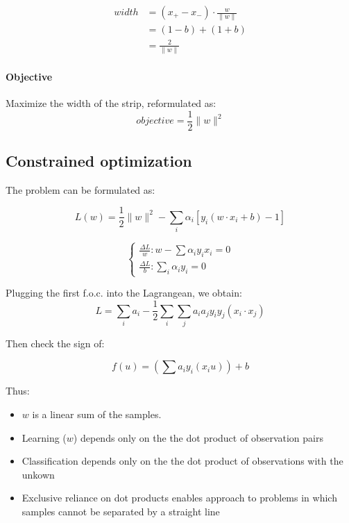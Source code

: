 \begin{equation}
  \begin{aligned}
    width &= (x_{+} - x_{-}) \cdot \frac{w}{\|w\|} \\
          &= (1-b) + (1+b) \\
          &= \frac{2}{\|w\|}
  \end{aligned}
\end{equation}

\paragraph{Objective} Maximize the width of the strip, 
reformulated as: 
\begin{equation}
  objective = \frac{1}{2}\|w\|^2
\end{equation}

\subsection{Constrained optimization}

The problem can be formulated as: 

\begin{equation}
  L(w) = \frac{1}{2}\|w\|^2 - 
  \sum_{i}{\alpha_{i}\left[ y_i(w \cdot x_i + b) - 1 \right]}
\end{equation}

\begin{equation}
  \begin{cases}
    \frac{\varDelta L}{w}: w - \sum{\alpha_{i}y_ix_i} = 0  \\
    \frac{\varDelta L}{b}: \sum_{i}{\alpha_{i}y_i } = 0
  \end{cases}
\end{equation}

Plugging the first f.o.c. into the Lagrangean, we obtain:
\begin{equation}
  L = \sum_i{a_i} - \frac{1}{2}
    \sum_{i}\sum_{j}{a_ia_jy_iy_j (x_i \cdot x_j)}
\end{equation}

Then check the sign of:

\begin{equation}
  f(u) = \left(\sum{a_i y_i (x_i u)}\right) + b
\end{equation}

Thus:
\begin{itemize}
  \item $w$ is a linear sum of the samples. 
  \item Learning ($w$) depends only on the the dot product 
    of observation pairs
  \item Classification depends only on the the dot product 
    of observations with the unkown
  \item Exclusive reliance on dot products enables approach 
    to problems in which samples cannot be separated by a
    straight line
\end{itemize}


